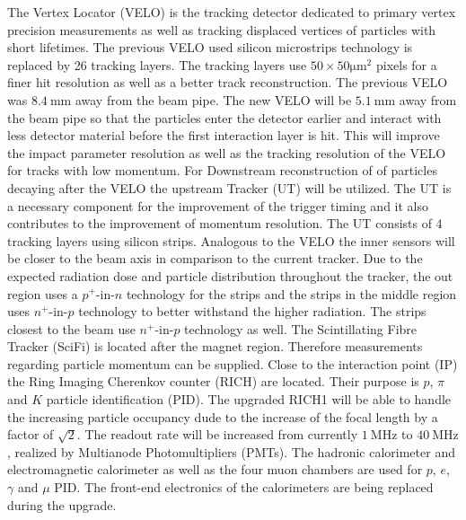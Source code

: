 The Vertex Locator (VELO) is the tracking detector dedicated to primary vertex precision measurements as well as tracking displaced vertices of particles with short lifetimes. The previous VELO used silicon microstrips technology is replaced by 26 tracking layers. The tracking layers use $50\times50\si{\micro\metre}^2$ pixels for a finer hit resolution as well as a better track reconstruction. The previous VELO was $\SI{8.4}{\milli\metre}$ away from the beam pipe. The new VELO will be $\SI{5.1}{\milli\metre}$ away from the beam pipe so that the particles enter the detector earlier and interact with less detector material before the first interaction layer is hit.
This will improve the impact parameter resolution as well as the tracking resolution of the VELO for tracks with low momentum\cite{Piucci}.
For Downstream reconstruction of of particles decaying after the VELO the upstream Tracker (UT) will be utilized. The UT is a necessary component for the improvement of the trigger timing and it also contributes to the improvement of momentum resolution. The UT consists of 4 tracking layers using silicon strips. Analogous to the VELO the inner sensors will be closer to the beam axis in comparison to the current tracker.
Due to the expected radiation dose and particle distribution throughout the tracker, the out region uses a $p^{+}$-in-$n$ technology for the strips and the strips in the middle region uses $n^{+}$-in-$p$ technology to better withstand the higher radiation. The strips closest to the beam use $n^{+}$-in-$p$ technology as well.
The Scintillating Fibre Tracker (SciFi) is located after the magnet region. Therefore measurements regarding particle momentum can be supplied.
Close to the interaction point (IP) the Ring Imaging Cherenkov counter (RICH) are located. Their purpose is $p$, $\pi$ and $K$ particle identification (PID).
The upgraded RICH1 will be able to handle the increasing particle occupancy dude to the increase of the focal length by a factor of $\sqrt{2}$.
The readout rate will be increased from currently $\SI{1}{\mega\hertz}$ to $\SI{40}{\mega\hertz}$, realized by Multianode Photomultipliers (PMTs).
The hadronic calorimeter and electromagnetic calorimeter as well as the four muon chambers are used for $p$, $e$, $\gamma$ and $\mu$ PID. The front-end electronics of the calorimeters are being replaced during the upgrade.


